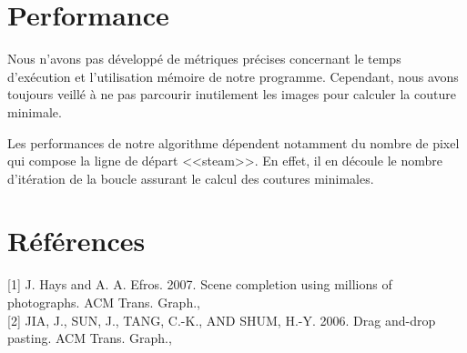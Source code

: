 \documentclass[a4paper]{article}
\begin{document}
\section{Performance}

Nous n'avons pas développé de métriques précises concernant le temps d'exécution et l'utilisation mémoire de notre programme. Cependant, nous avons toujours veillé à ne pas parcourir inutilement les images pour calculer la couture minimale.

Les performances de notre algorithme dépendent notamment du nombre de pixel qui compose la ligne de départ <<steam>>. En effet, il en découle le nombre d'itération de la boucle assurant le calcul des coutures minimales.

\section{Références}

[1] J. Hays and A. A. Efros.  2007. Scene completion using millions of photographs. ACM Trans. Graph.,
\\

[2] JIA, J., SUN, J., TANG, C.-K., AND SHUM, H.-Y. 2006. Drag and-drop pasting. ACM Trans. Graph.,
\end{document}
